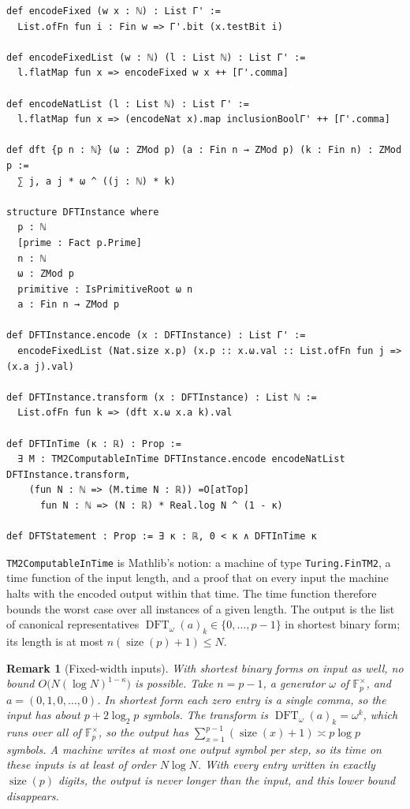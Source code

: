 \documentclass[11pt]{amsart}
\newtheorem{remark}[lemma]{Remark}
\newcommand{\F}{\mathbb{F}}
\newcommand{\size}{\operatorname{size}}
\newcommand{\DFT}{\operatorname{DFT}}
\begin{document}
\noindent\begin{minipage}{\linewidth}
\begin{lstlisting}
def encodeFixed (w x : ℕ) : List Γ' :=
  List.ofFn fun i : Fin w => Γ'.bit (x.testBit i)

def encodeFixedList (w : ℕ) (l : List ℕ) : List Γ' :=
  l.flatMap fun x => encodeFixed w x ++ [Γ'.comma]

def encodeNatList (l : List ℕ) : List Γ' :=
  l.flatMap fun x => (encodeNat x).map inclusionBoolΓ' ++ [Γ'.comma]

def dft {p n : ℕ} (ω : ZMod p) (a : Fin n → ZMod p) (k : Fin n) : ZMod p :=
  ∑ j, a j * ω ^ ((j : ℕ) * k)

structure DFTInstance where
  p : ℕ
  [prime : Fact p.Prime]
  n : ℕ
  ω : ZMod p
  primitive : IsPrimitiveRoot ω n
  a : Fin n → ZMod p

def DFTInstance.encode (x : DFTInstance) : List Γ' :=
  encodeFixedList (Nat.size x.p) (x.p :: x.ω.val :: List.ofFn fun j => (x.a j).val)

def DFTInstance.transform (x : DFTInstance) : List ℕ :=
  List.ofFn fun k => (dft x.ω x.a k).val

def DFTInTime (κ : ℝ) : Prop :=
  ∃ M : TM2ComputableInTime DFTInstance.encode encodeNatList DFTInstance.transform,
    (fun N : ℕ => (M.time N : ℝ)) =O[atTop]
      fun N : ℕ => (N : ℝ) * Real.log N ^ (1 - κ)

def DFTStatement : Prop := ∃ κ : ℝ, 0 < κ ∧ DFTInTime κ
\end{lstlisting}
\end{minipage}

\texttt{TM2ComputableInTime} is Mathlib's notion: a machine of type \texttt{Turing.FinTM2}, a
time function of the input length, and a proof that on every input the machine halts with the
encoded output within that time. The time function therefore bounds the worst case over all
instances of a given length. The output is the list of canonical representatives
$\DFT_\omega(a)_k \in \{0, \dots, p-1\}$ in shortest binary form; its length is at most
$n (\size(p) + 1) \le N$.

\begin{remark}[Fixed-width inputs]
\label{rem:width}
With shortest binary forms on input as well, no bound $O\bigl(N (\log N)^{1-\kappa}\bigr)$ is
possible. Take $n = p - 1$, a generator $\omega$ of $\F_p^\times$, and
$a = (0, 1, 0, \dots, 0)$. In shortest form each zero entry is a single comma, so the input has about
$p + 2\log_2 p$ symbols. The transform is $\DFT_\omega(a)_k = \omega^k$, which runs over all of $\F_p^\times$, so
the output has $\sum_{x=1}^{p-1} (\size(x) + 1) \asymp p \log p$ symbols. A machine writes at
most one output symbol per step, so its time on these inputs is at least of order $N \log N$.
With every entry written in exactly $\size(p)$ digits, the output is never longer than the
input, and this lower bound disappears.
\end{remark}
\end{document}

